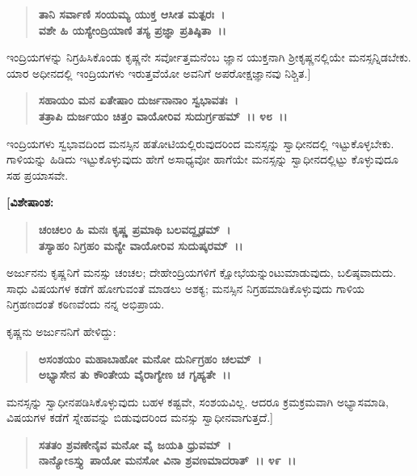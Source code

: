 \begin{verse}
\textbf{ತಾನಿ ಸರ್ವಾಣಿ ಸಂಯಮ್ಯ ಯುಕ್ತ ಆಸೀತ ಮತ್ಪರಃ~।}\\\textbf{ವಶೇ ಹಿ ಯಸ್ಯೇಂದ್ರಿಯಾಣಿ ತಸ್ಯ ಪ್ರಜ್ಞಾ ಪ್ರತಿಷ್ಠಿತಾ~।।}
\end{verse}

ಇಂದ್ರಿಯಗಳನ್ನು ನಿಗ್ರಹಿಸಿಕೊಂಡು ಕೃಷ್ಣನೇ ಸರ್ವೋತ್ತಮನೆಂಬ ಜ್ಞಾನ ಯುಕ್ತನಾಗಿ ಶ‍್ರೀಕೃಷ್ಣನಲ್ಲಿಯೇ ಮನಸ್ಸನ್ನಿಡಬೇಕು. ಯಾರ ಅಧೀನದಲ್ಲಿ ಇಂದ್ರಿಯಗಳು ಇರುತ್ತವೆಯೋ ಅವನಿಗೆ ಅಪರೋಕ್ಷಜ್ಞಾನವು ನಿಶ್ಚಿತ.]

\begin{verse}
\textbf{ಸಹಾಯಂ ಮನ ಏತೇಷಾಂ ದುರ್ಜನಾನಾಂ ಸ್ವಭಾವತಃ~।}\\\textbf{ತತ್ರಾಪಿ ದುರ್ಜಯಂ ಚಿತ್ತಂ ವಾಯೋರಿವ ಸುದುರ್ಗ್ರಹಮ್~।। ೪೮~।।}
\end{verse}

ಇಂದ್ರಿಯಗಳು ಸ್ವಭಾವದಿಂದ ಮನಸ್ಸಿನ ಹತೋಟಿಯಲ್ಲಿರುವುದರಿಂದ ಮನಸ್ಸನ್ನು ಸ್ವಾಧೀನದಲ್ಲಿ ಇಟ್ಟುಕೊಳ್ಳಬೇಕು. ಗಾಳಿಯನ್ನು ಹಿಡಿದು ಇಟ್ಟುಕೊಳ್ಳುವುದು ಹೇಗೆ ಅಸಾಧ್ಯವೋ ಹಾಗೆಯೇ ಮನಸ್ಸನ್ನು ಸ್ವಾಧೀನದಲ್ಲಿಟ್ಟು ಕೊಳ್ಳುವುದೂ ಸಹ ಪ್ರಯಾಸವೇ.

\begin{flushleft}
\textbf{[ವಿಶೇಷಾಂಶ:}
\end{flushleft}

\begin{verse}
\textbf{ಚಂಚಲಂ ಹಿ ಮನಃ ಕೃಷ್ಣ ಪ್ರಮಾಥಿ ಬಲವದ್ದೃಢಮ್~।}\\\textbf{ತಸ್ಯಾಹಂ ನಿಗ್ರಹಂ ಮನ್ಯೇ ವಾಯೋರಿವ ಸುದುಷ್ಕರಮ್~।।} 
\end{verse}

ಅರ್ಜುನನು ಕೃಷ್ಣನಿಗೆ ಮನಸ್ಸು ಚಂಚಲ; ದೇಹೇಂದ್ರಿಯಗಳಿಗೆ ಕ್ಷೋಭೆಯನ್ನುಂಟುಮಾಡುವುದು, ಬಲಿಷ್ಠವಾದುದು. ಸಾಧು ವಿಷಯಗಳ ಕಡೆಗೆ ಹೋಗುವಂತೆ ಮಾಡಲು ಅಶಕ್ಯ; ಮನಸ್ಸಿನ ನಿಗ್ರಹಮಾಡಿಕೊಳ್ಳುವುದು ಗಾಳಿಯ ನಿಗ್ರಹಣದಂತೆ ಕಠಿಣವೆಂದು ನನ್ನ ಅಭಿಪ್ರಾಯ.

\begin{flushleft}
ಕೃಷ್ಣನು ಅರ್ಜುನನಿಗೆ ಹೇಳಿದ್ದು:
\end{flushleft}

\begin{verse}
\textbf{ಅಸಂಶಯಂ ಮಹಾಬಾಹೋ ಮನೋ ದುರ್ನಿಗ್ರಹಂ ಚಲಮ್~।}\\\textbf{ಅಭ್ಯಾಸೇನ ತು ಕೌಂತೇಯ ವೈರಾಗ್ಯೇಣ ಚ ಗೃಹ್ಯತೇ~।।} 
\end{verse}

ಮನಸ್ಸನ್ನು ಸ್ವಾಧೀನಪಡಿಸಿಕೊಳ್ಳುವುದು ಬಹಳ ಕಷ್ಟವೇ, ಸಂಶಯವಿಲ್ಲ. ಆದರೂ ಕ್ರಮಕ್ರಮವಾಗಿ ಅಭ್ಯಾಸಮಾಡಿ, ವಿಷಯಗಳ ಕಡೆಗೆ ಸ್ನೇಹವನ್ನು ಬಿಡುವುದರಿಂದ ಮನಸ್ಸು ಸ್ವಾಧೀನವಾಗುತ್ತದೆ.]

\begin{verse}
\textbf{ಸತತಂ ಶ್ರವಣೇನೈವ ಮನೋ ವೈ ಜಯತಿ ಧ್ರುವಮ್~।}\\\textbf{ನಾನ್ಯೋಽಸ್ತ್ಯು ಪಾಯೋ ಮನಸೋ ವಿನಾ ಶ್ರವಣಮಾದರಾತ್~।। ೪೯~।।}
\end{verse}

